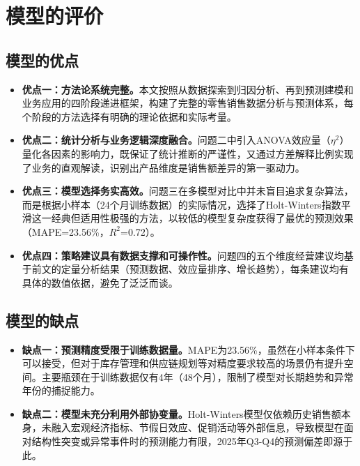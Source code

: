 

\section{模型的评价}

\subsection{模型的优点}

\begin{itemize}
  \item \textbf{优点一：方法论系统完整。}本文按照从数据探索到归因分析、再到预测建模和业务应用的四阶段递进框架，构建了完整的零售销售数据分析与预测体系，每个阶段的方法选择有明确的理论依据和实际考量。
  \item \textbf{优点二：统计分析与业务逻辑深度融合。}问题二中引入ANOVA效应量（$\eta^2$）量化各因素的影响力，既保证了统计推断的严谨性，又通过方差解释比例实现了业务的直观解读，识别出产品维度是销售额差异的第一驱动力。
  \item \textbf{优点三：模型选择务实高效。}问题三在多模型对比中并未盲目追求复杂算法，而是根据小样本（24个月训练数据）的实际情况，选择了Holt-Winters指数平滑这一经典但适用性极强的方法，以较低的模型复杂度获得了最优的预测效果（MAPE=23.56\%，$R^2$=0.72）。
  \item \textbf{优点四：策略建议具有数据支撑和可操作性。}问题四的五个维度经营建议均基于前文的定量分析结果（预测数据、效应量排序、增长趋势），每条建议均有具体的数值依据，避免了泛泛而谈。
\end{itemize}

\subsection{模型的缺点}

\begin{itemize}
  \item \textbf{缺点一：预测精度受限于训练数据量。}MAPE为23.56\%，虽然在小样本条件下可以接受，但对于库存管理和供应链规划等对精度要求较高的场景仍有提升空间。主要瓶颈在于训练数据仅有4年（48个月），限制了模型对长期趋势和异常年份的捕捉能力。
  \item \textbf{缺点二：模型未充分利用外部协变量。}Holt-Winters模型仅依赖历史销售额本身，未融入宏观经济指标、节假日效应、促销活动等外部信息，导致模型在面对结构性突变或异常事件时的预测能力有限，2025年Q3-Q4的预测偏差即源于此。
\end{itemize}
